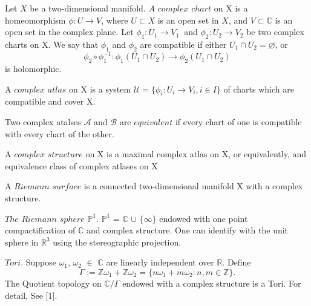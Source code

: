 \begin{defn} Let $X$ be a two-dimensional manifold. $A$ $complex$ $chart $ on X is a homeomorphism $ \phi : U \to V $, where $U \subset X$ is an open set in $X$, and $V \subset \mathbb{C}$ is an open set in the complex plane. Let $\phi_1 : U_1 \to V_1\ $ and $\phi_2 : U_2 \to V_2 $ be two complex charts on X. We say that $\phi_1$ and $\phi_2$ are compatible if  either $ U_1 \cap U_2 = \varnothing $, or 
\begin{equation*} \phi_2 \circ \phi_1^{-1} : \phi_1(U_1 \cap U_2) \to \phi_2(U_1 \cap U_2)
\end{equation*} is holomorphic.

\end{defn}
\begin{defn}A $complex$ $atlas$ on X is a system $\mathcal{U} = \{ \phi_i : U_i \to V_i, i \in I \}$ of charts which are compatible and cover X.
\end{defn}
\begin{defn} Two complex atalses $\mathcal{A}$ and $\mathcal{B}$ are $equivalent$ if every chart of one is compatible with every chart of the other.
\end{defn}

\begin{defn} A $complex$ $structure$ on X is a maximal complex atlas on X, or equivalently, and equivalence class of complex atlases on X
\end{defn}

\begin{defn} A $Riemann$ $surface$ is a connected two-dimensional manifold X with a complex structure.
\end{defn} 
\begin{exmp} $The$ $Riemann$ $sphere$ $\mathbb{P}^1$. $\mathbb{P}^1$ = $\mathbb{C}$ $\cup$ $\{\infty \}$ endowed with one point compactification of $\mathbb{C}$ and complex structure. One can identify with the unit sphere in $\mathbb{R}^{3}$ using the stereographic projection.
\end{exmp}

\begin{exmp} $Tori$. Suppose $\omega_1$, $\omega_2$ $\in$ $\mathbb{C}$ are linearly independent over $\mathbb{R}$. Define 
\begin{equation*} \Gamma := \mathbb{Z}\omega_1 + \mathbb{Z}\omega_2 = \{n\omega_1 + m\omega_2 : n,m \in \mathbb{Z} \}.
\end{equation*}  
The Quotient topology on $ \mathbb{C}/\Gamma $ endowed with a complex structure is a Tori. For detail, See [1].
\end{exmp}

